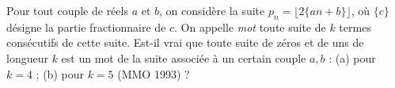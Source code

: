 Pour tout couple de réels $a$ et $b$, on considère la suite $p_n = \lfloor 2\{an + b\} \rfloor$, où $\{c\}$ désigne la partie fractionnaire de $c$. On appelle \emph{mot} toute suite de $k$ termes consécutifs de cette suite. Est-il vrai que toute suite de zéros et de uns de longueur $k$ est un mot de la suite associée à un certain couple $a, b$ : (a) pour $k = 4$ ; (b) pour $k = 5$ (MMO 1993) ?

